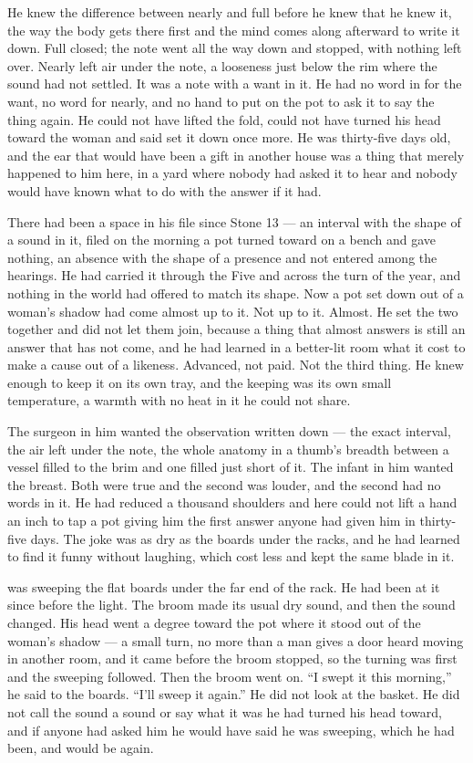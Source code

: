 He knew the difference between nearly and full before he knew that he knew it, the way the body gets there first and the mind comes along afterward to write it down. Full closed; the note went all the way down and stopped, with nothing left over. Nearly left air under the note, a looseness just below the rim where the sound had not settled. It was a note with a want in it. He had no word in  for the want, no word for nearly, and no hand to put on the pot to ask it to say the thing again. He could not have lifted the fold, could not have turned his head toward the woman and said set it down once more. He was thirty-five days old, and the ear that would have been a gift in another house was a thing that merely happened to him here, in a yard where nobody had asked it to hear and nobody would have known what to do with the answer if it had.

There had been a space in his file since Stone 13 --- an interval with the shape of a sound in it, filed on the morning a pot turned toward on a bench and gave nothing, an absence with the shape of a presence and not entered among the hearings. He had carried it through the Five and across the turn of the year, and nothing in the world had offered to match its shape. Now a pot set down out of a woman's shadow had come almost up to it. Not up to it. Almost. He set the two together and did not let them join, because a thing that almost answers is still an answer that has not come, and he had learned in a better-lit room what it cost to make a cause out of a likeness. Advanced, not paid. Not the third thing. He knew enough to keep it on its own tray, and the keeping was its own small temperature, a warmth with no heat in it he could not share.

The surgeon in him wanted the observation written down --- the exact interval, the air left under the note, the whole anatomy in a thumb's breadth between a vessel filled to the brim and one filled just short of it. The infant in him wanted the breast. Both were true and the second was louder, and the second had no words in it. He had reduced a thousand shoulders and here could not lift a hand an inch to tap a pot giving him the first answer anyone had given him in thirty-five days. The joke was as dry as the boards under the racks, and he had learned to find it funny without laughing, which cost less and kept the same blade in it.

\scenebreak

 was sweeping the flat boards under the far end of the rack. He had been at it since before the light. The broom made its usual dry sound, and then the sound changed. His head went a degree toward the pot where it stood out of the woman's shadow --- a small turn, no more than a man gives a door heard moving in another room, and it came before the broom stopped, so the turning was first and the sweeping followed. Then the broom went on. “I swept it this morning,” he said to the boards. “I'll sweep it again.” He did not look at the basket. He did not call the sound a sound or say what it was he had turned his head toward, and if anyone had asked him he would have said he was sweeping, which he had been, and would be again.

